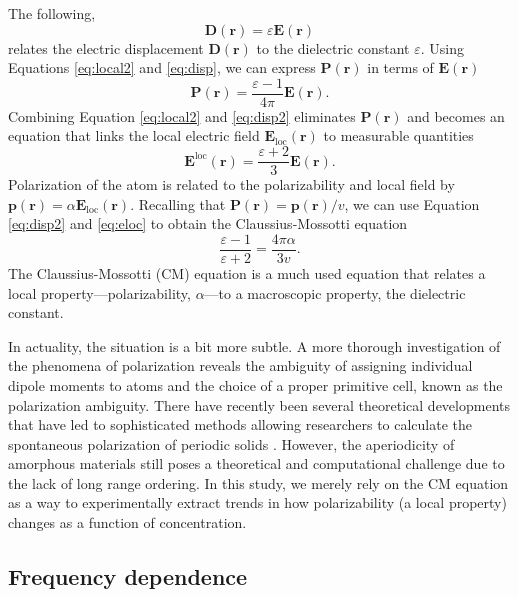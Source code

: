 The following,
\begin{equation}\label{eq:disp}
\textbf{D}(\textbf{r}) = \varepsilon\textbf{E}(\textbf{r})
\end{equation}
relates the electric displacement $\textbf{D}(\textbf{r})$ to the dielectric constant $\varepsilon$. Using Equations \ref{eq:local2} and \ref{eq:disp}, we can express $\textbf{P}(\textbf{r})$ in terms of $\textbf{E}(\textbf{r})$
\begin{equation}\label{eq:disp2}
\textbf{P}(\textbf{r}) = \frac{\varepsilon - 1}{4\pi}\textbf{E}(\textbf{r}).
\end{equation}
Combining Equation \ref{eq:local2} and \ref{eq:disp2} eliminates $\textbf{P}(\textbf{r})$ and becomes an equation that links the local electric field $\textbf{E}_{\text{loc}}(\textbf{r})$ to measurable quantities
\begin{equation}
\textbf{E}^{\text{loc}}(\textbf{r}) = \frac{\varepsilon + 2}{3}\textbf{E}(\textbf{r}).
\label{eq:eloc}
\end{equation}
Polarization of the atom is related to the polarizability and local field by $\textbf{p}(\textbf{r}) = \alpha\textbf{E}_{\text{loc}}(\textbf{r})$. Recalling that $\textbf{P}(\textbf{r}) = \textbf{p}(\textbf{r})/v$, we can use Equation \ref{eq:disp2} and \ref{eq:eloc} to obtain the Claussius-Mossotti equation 
\begin{equation}
\frac{\varepsilon - 1}{\varepsilon + 2} = \frac{4\pi\alpha}{3v}.
\label{eq:CM}
\end{equation}
The Claussius-Mossotti (CM) equation is a much used equation that relates a local property---polarizability, $\alpha$---to a macroscopic property, the dielectric constant. 

In actuality, the situation is a bit more subtle. A more thorough investigation of the phenomena of polarization reveals the ambiguity of assigning individual dipole moments to atoms and the choice of a proper primitive cell, known as the polarization ambiguity. There have recently been several theoretical developments that have led to sophisticated methods allowing researchers to calculate the spontaneous polarization of periodic solids \cite{Spaldin2012}. However, the aperiodicity of amorphous materials still poses a theoretical and computational challenge due to the lack of long range ordering. In this study, we merely rely on the CM equation as a way to experimentally extract trends in how polarizability (a local property) changes as a function of concentration. 

\subsection{Frequency dependence}

